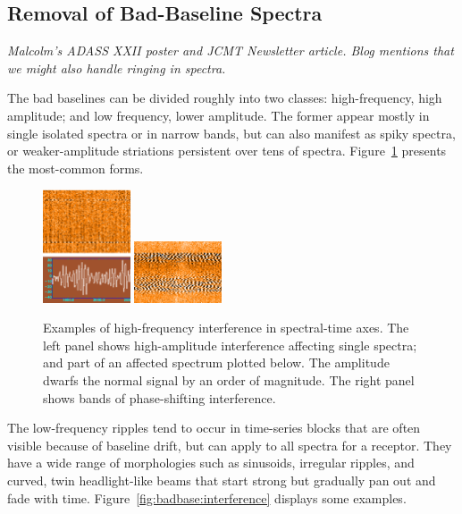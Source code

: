 \documentclass[final,authoryear,5p,times,twocolumn]{elsarticle}
\begin{document}
\subsection{Removal of Bad-Baseline Spectra}



\textit{Malcolm's ADASS XXII poster and JCMT Newsletter article. Blog mentions
that we might also handle ringing in spectra.}

The bad baselines can be divided roughly into two classes:
high-frequency, high amplitude; and low frequency, lower
amplitude. The former appear mostly in single isolated spectra or in
narrow bands, but can also manifest as spiky spectra, or
weaker-amplitude striations persistent over tens of spectra.
Figure~\ref{fig:badbase:highfreq} presents the most-common forms.

\begin{figure}[!ht]
\includegraphics[width=0.23\textwidth]{P61_f1a}
\includegraphics[width=0.23\textwidth]{P61_f1b}
\caption{Examples of high-frequency interference in spectral-time
  axes. The left panel shows high-amplitude interference affecting
  single spectra; and part of an affected spectrum plotted below. The
  amplitude dwarfs the normal signal by an order of magnitude. The
  right panel shows bands of phase-shifting interference.}
\label{fig:badbase:highfreq}
\end{figure}

The low-frequency ripples tend to occur in time-series blocks that are
often visible because of baseline drift, but can apply to all spectra
for a receptor. They have a wide range of morphologies such as
sinusoids, irregular ripples, and curved, twin headlight-like beams
that start strong but gradually pan out and fade with time.
Figure~\ref{fig:badbase:interference} displays some examples.
\end{document}
